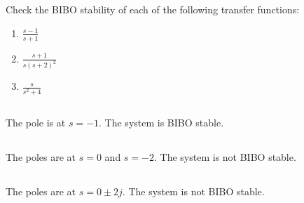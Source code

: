 \section{}
Check the BIBO stability of each of the following transfer functions:
\begin{enumerate}[label=(\alph*)]
    \item $\frac{s-1}{s+1}$
    \item $\frac{s+1}{s(s+2)^2}$
    \item $\frac{s}{s^2+4}$
\end{enumerate}

\subsection{}
The pole is at $s=-1$. The system is BIBO stable.

\subsection{}
The poles are at $s=0$ and $s=-2$. The system is not BIBO stable.

\subsection{}
The poles are at $s=0 \pm 2j$. The system is not BIBO stable.
